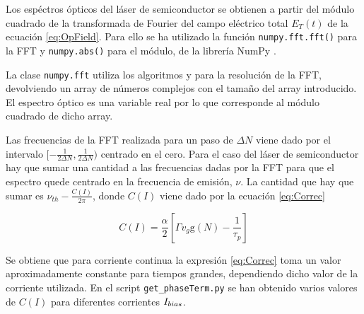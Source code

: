		Los esp\'ectros \'opticos del l\'aser de semiconductor se obtienen a partir del m\'odulo cuadrado de la transformada de Fourier del campo el\'ectrico total $E_T(t)$ de la ecuaci\'on \ref{eq:OpField}. Para ello se ha utilizado la función \texttt{numpy.fft.fft()} para la FFT y \texttt{numpy.abs()} para el m\'odulo, de la librer\'ia NumPy \cite{numpy}.

		La clase \texttt{numpy.fft} utiliza los algoritmos \cite{numerical} y \cite{cooley1965algorithm} para la resoluci\'on de la FFT, devolviendo un array de n\'umeros complejos con el tamaño del array introducido. El espectro \'optico es una variable real por lo que corresponde al m\'odulo cuadrado de dicho array. 

		Las frecuencias de la FFT realizada para un paso de $\Delta N$ viene dado por el intervalo $[-\frac{1}{2\Delta N}, \frac{1}{2\Delta N})$ centrado en el cero. Para el caso del l\'aser de semiconductor hay que sumar una cantidad a las frecuencias dadas por la FFT para que el espectro quede centrado en la frecuencia de emisión, $\nu$. La cantidad que hay que sumar es $\nu_{th} - \frac{C(I)}{2\pi}$, donde $C(I)$ viene dado por la ecuación \ref{eq:Correc} %

			\begin{equation}
				C (I) = \frac{\alpha}{2} \left[ \Gamma v_g \textrm{g}(N) - \frac{1}{\tau_p} \right]
				\label{eq:Correc}
			\end{equation}

		Se obtiene que para corriente continua la expresi\'on \ref{eq:Correc} toma un valor aproximadamente constante para tiempos grandes, dependiendo dicho valor de la corriente utilizada. En el script \texttt{get\_phaseTerm.py} se han obtenido varios valores de $C(I)$ para diferentes corrientes $I_{bias}$.



